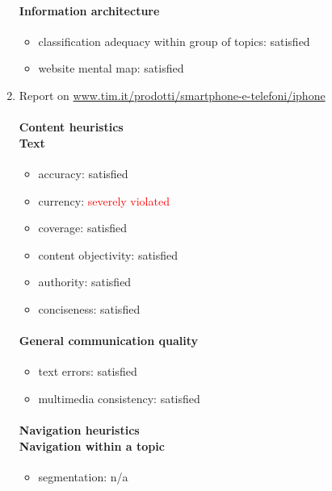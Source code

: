 \begin{enumerate}
	\paragraph*{Information architecture}
	\begin{itemize}
		\item classification adequacy within group of topics: satisfied
		\item website mental map: satisfied
	\end{itemize}


\item Report on \url{www.tim.it/prodotti/smartphone-e-telefoni/iphone}
	\paragraph*{Content heuristics \\ Text}
	\begin{itemize}
		\item accuracy: satisfied
		\item currency: \textcolor{red}{severely violated}
		\item coverage: satisfied
		\item content objectivity: satisfied
		\item authority: satisfied
		\item conciseness: satisfied		
	\end{itemize}
	
	\paragraph*{General communication quality}
	\begin{itemize}
		\item text errors: satisfied
		\item multimedia consistency: satisfied
	\end{itemize}
	
	\paragraph*{Navigation heuristics \\ Navigation within a topic}
	\begin{itemize}
		\item segmentation: n/a
	\end{itemize}	
	

\end{enumerate}
